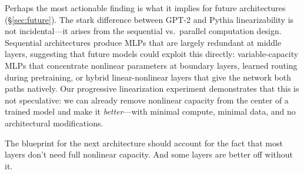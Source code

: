 \documentclass[11pt]{article}
\begin{document}
Perhaps the most actionable finding is what it implies for future architectures (\S\ref{sec:future}). The stark difference between GPT-2 and Pythia linearizability is not incidental---it arises from the sequential vs.\ parallel computation design. Sequential architectures produce MLPs that are largely redundant at middle layers, suggesting that future models could exploit this directly: variable-capacity MLPs that concentrate nonlinear parameters at boundary layers, learned routing during pretraining, or hybrid linear-nonlinear layers that give the network both paths natively. Our progressive linearization experiment demonstrates that this is not speculative: we can already remove nonlinear capacity from the center of a trained model and make it \textit{better}---with minimal compute, minimal data, and no architectural modifications.

The blueprint for the next architecture should account for the fact that most layers don't need full nonlinear capacity. And some layers are better off without it.
\end{document}
